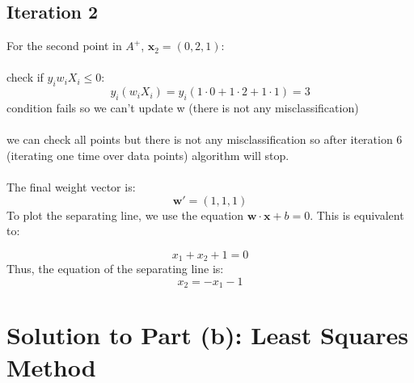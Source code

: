 \documentclass[a4paper, 11pt]{article}
\begin{document}
	\subsection*{Iteration 2}
	For the second point in $A^+$, $\mathbf{x}_2 = (0, 2, 1)$:
	\\\\
	check if \(y_i w_i X_i \le 0\):
	\[
	y_i (w_i X_i) = y_i (1\cdot0 + 1\cdot2 + 1\cdot1) = 3
	\]
	condition fails so we can't update w (there is not any misclassification)
	\\\\
	we can check all points but there is not any misclassification so after iteration 6 (iterating one time over data points) algorithm will stop.
	\\\\
	The final weight vector is:
	\[
	\mathbf{w}' = (1, 1, 1)
	\]
	To plot the separating line, we use the equation \( \mathbf{w} \cdot \mathbf{x} + b = 0 \). This is equivalent to:
	
	\[
	x_1 + x_2 + 1 = 0
	\]
	Thus, the equation of the separating line is:
	\[
	x_2 = -x_1 - 1
	\]
		
	\section*{Solution to Part (b): Least Squares Method}
\end{document}
